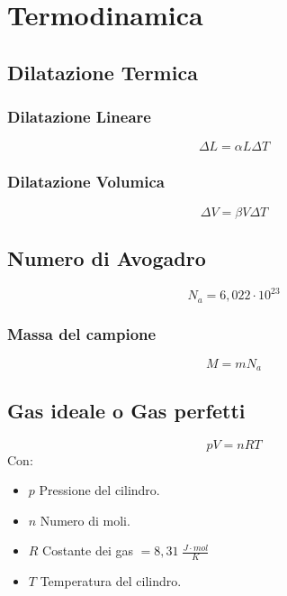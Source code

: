 \chapter{Termodinamica}

    \section{Dilatazione Termica}
        \subsection{Dilatazione Lineare}
            \begin{equation}
                \Delta L = \alpha L \Delta T
            \end{equation}
        \subsection{Dilatazione Volumica}
            \begin{equation}
                \Delta V = \beta V \Delta T
            \end{equation}
    \section{Numero di Avogadro}
        \begin{equation*}
            N_a = 6,022 \cdot 10^{23}
        \end{equation*}

        \subsection{Massa del campione}
            \begin{equation}
                M = mN_a
            \end{equation}
    
    \section{Gas ideale o Gas perfetti}
        \begin{equation}
            pV = nRT
        \end{equation}
    Con:
        \begin{itemize}
            \item $p$ Pressione del cilindro.
            \item $n$ Numero di moli.
            \item $R$ Costante dei gas $= 8,31 \; \frac{J \cdot mol}{K}$
            \item $T$ Temperatura del cilindro.
        \end{itemize}
